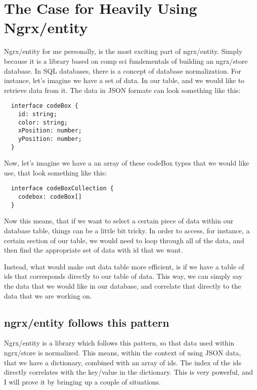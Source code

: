 \maketitle{}
\section{ The Case for Heavily Using Ngrx/entity }
Ngrx/entity for me personally, is the most exciting part of ngrx/entity. Simply
because it is a library based on comp sci fundementals of building an ngrx/store
database. In SQL databases, there is a concept of database normalization. For
instance, let's imagine we have a set of data. In our table, and we would like
to retrieve data from it. The data in JSON formate can look something like this:
\begin{lstlisting}
  interface codeBox {
    id: string;
    color: string;
    xPosition: number;
    yPosition: number;
  }
\end{lstlisting}

Now, let's imagine we have a an array of these codeBox types that we would like
use, that look something like this:
\begin{lstlisting}
  interface codeBoxCollection {
    codebox: codeBox[]
  }
\end{lstlisting}

Now this means, that if we want to select a certain piece of data within our
database table, things can be a little bit tricky. In order to access, for
instance, a certain section of our table, we would need to loop through all of
the data, and then find the appropriate set of data with id that we want.

Instead, what would make out data table more efficient, is if we have a table
of ids that corresponds directly to our table of data. This way, we can simply
say the data that we would like in our database, and correlate that directly to
the data that we are working on.

\subsection{ngrx/entity follows this pattern}
Ngrx/entity is a library which follows this pattern, so that data used within
ngrx/store is normalized. This means, within the context of using JSON data,
that we have a dictionary, combined with an array of ids. The index of the ids
directly correlates with the key/value in the dictionary. This is very powerful,
and I will prove it by bringing up a couple of situations.

